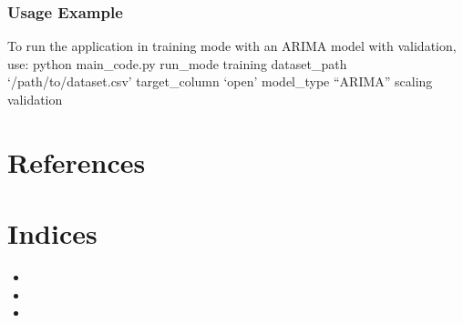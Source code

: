 \documentclass[letterpaper,10pt,english]{sphinxmanual}
\begin{document}
\subsection{Usage Example}
\label{\detokenize{docs/parser_arguments:usage-example}}
\sphinxAtStartPar
To run the application in training mode with an ARIMA model with validation, use:
{\color{red}\bfseries{}\textasciigrave{}\textasciigrave{}}python main\_code.py \textendash{}run\_mode training \textendash{}dataset\_path ‘/path/to/dataset.csv’ \textendash{}target\_column ‘open’ \textendash{}model\_type “ARIMA” \textendash{}scaling \textendash{}validation \textasciigrave{}\textasciigrave{}


\chapter{References}
\label{\detokenize{index:references}}
\sphinxAtStartPar
{}


\chapter{Indices}
\label{\detokenize{index:indices}}\begin{itemize}
\item {} 
\sphinxAtStartPar
{}

\item {} 
\sphinxAtStartPar
{}

\item {} 
\sphinxAtStartPar
{}

\end{itemize}
\end{document}
